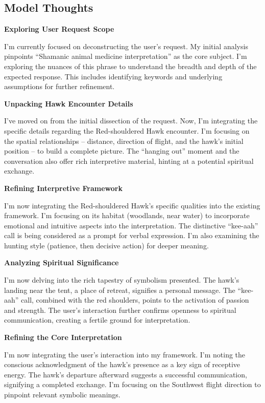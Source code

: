 \documentclass{article}
\begin{document}
\subsection*{Model Thoughts}\label{model-thoughts}

\textbf{Exploring User Request Scope}

I'm currently focused on deconstructing the user's request. My initial
analysis pinpoints ``Shamanic animal medicine interpretation'' as the
core subject. I'm exploring the nuances of this phrase to understand the
breadth and depth of the expected response. This includes identifying
keywords and underlying assumptions for further refinement.

\textbf{Unpacking Hawk Encounter Details}

I've moved on from the initial dissection of the request. Now, I'm
integrating the specific details regarding the Red-shouldered Hawk
encounter. I'm focusing on the spatial relationships -- distance,
direction of flight, and the hawk's initial position -- to build a
complete picture. The ``hanging out'' moment and the conversation also
offer rich interpretive material, hinting at a potential spiritual
exchange.

\textbf{Refining Interpretive Framework}

I'm now integrating the Red-shouldered Hawk's specific qualities into
the existing framework. I'm focusing on its habitat (woodlands, near
water) to incorporate emotional and intuitive aspects into the
interpretation. The distinctive ``kee-aah'' call is being considered as
a prompt for verbal expression. I'm also examining the hunting style
(patience, then decisive action) for deeper meaning.

\textbf{Analyzing Spiritual Significance}

I'm now delving into the rich tapestry of symbolism presented. The
hawk's landing near the tent, a place of retreat, signifies a personal
message. The ``kee-aah'' call, combined with the red shoulders, points
to the activation of passion and strength. The user's interaction
further confirms openness to spiritual communication, creating a fertile
ground for interpretation.

\textbf{Refining the Core Interpretation}

I'm now integrating the user's interaction into my framework. I'm noting
the conscious acknowledgment of the hawk's presence as a key sign of
receptive energy. The hawk's departure afterward suggests a successful
communication, signifying a completed exchange. I'm focusing on the
Southwest flight direction to pinpoint relevant symbolic meanings.
\end{document}
